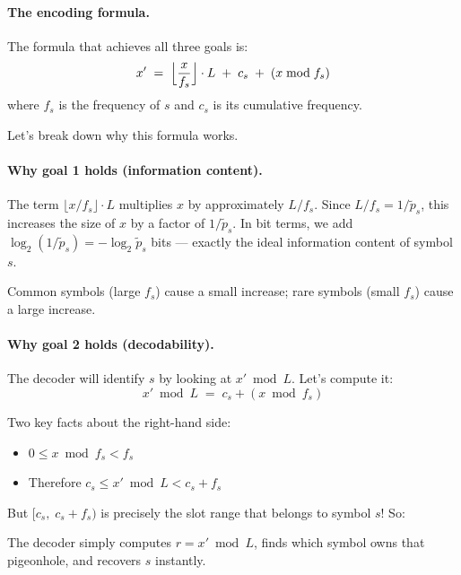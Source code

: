 \paragraph{The encoding formula.}
The formula that achieves all three goals is:
\begin{equation}
  \label{eq:rans_enc}
  x' \;=\; \Bigl\lfloor \frac{x}{f_s} \Bigr\rfloor \cdot L
          \;+\; c_s \;+\; (x \bmod f_s)
\end{equation}
where $f_s$ is the frequency of $s$ and $c_s$ is its
cumulative frequency.

Let's break down why this formula works.

\paragraph{Why goal 1 holds (information content).}
The term $\lfloor x/f_s \rfloor \cdot L$ multiplies $x$ by
approximately $L/f_s$.  Since $L/f_s = 1/\tilde{p}_s$, this
increases the size of $x$ by a factor of $1/\tilde{p}_s$.
In bit terms, we add $\log_2(1/\tilde{p}_s) = -\log_2 \tilde{p}_s$
bits — exactly the ideal information content of symbol $s$.

Common symbols (large $f_s$) cause a small increase; rare
symbols (small $f_s$) cause a large increase.

\paragraph{Why goal 2 holds (decodability).}
The decoder will identify $s$ by looking at $x' \bmod L$.
Let's compute it:
\[
x' \bmod L \;=\; c_s + (x \bmod f_s)
\]

Two key facts about the right-hand side:
\begin{itemize}
  \item $0 \le x \bmod f_s < f_s$
  \item Therefore $c_s \le x' \bmod L < c_s + f_s$
\end{itemize}

But $[c_s,\; c_s+f_s)$ is precisely the slot range that
belongs to symbol $s$!  So:

\begin{center}
\end{center}

The decoder simply computes $r = x' \bmod L$, finds which
symbol owns that pigeonhole, and recovers $s$ instantly.

